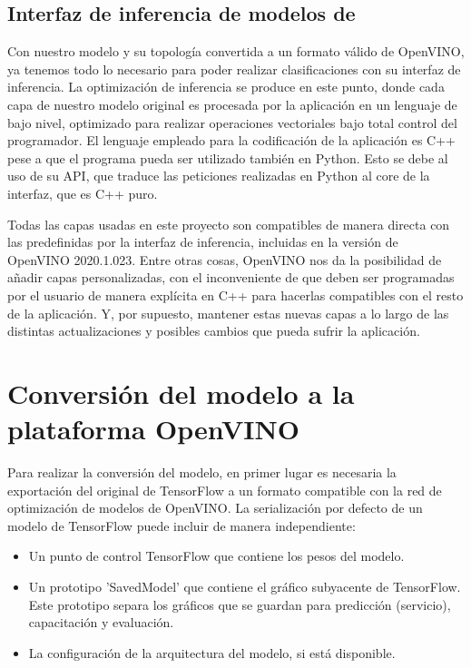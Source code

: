 \subsection{Interfaz de inferencia de modelos de }
\label{subsec:interfaz-de-infernecia-de-modelos-de-deep-learning}
Con nuestro modelo y su topología convertida a un formato válido de OpenVINO, ya tenemos todo lo necesario para poder realizar clasificaciones con su interfaz de inferencia\@.
La optimización de inferencia se produce en este punto, donde cada capa de nuestro modelo original es procesada por la aplicación en un lenguaje de bajo nivel, optimizado para realizar operaciones vectoriales bajo total control del programador.
El lenguaje empleado para la codificación de la aplicación es C++ pese a que el programa pueda ser utilizado también en Python.
Esto se debe al uso de su API, que traduce las peticiones realizadas en Python al core de la interfaz, que es C++ puro.

Todas las capas usadas en este proyecto son compatibles de manera directa con las predefinidas por la interfaz de inferencia, incluidas en la versión de OpenVINO 2020.1.023.
Entre otras cosas, OpenVINO nos da la posibilidad de añadir capas personalizadas, con el inconveniente de que deben ser programadas por el usuario de manera explícita en C++ para hacerlas compatibles con el resto de la aplicación.
Y, por supuesto, mantener estas nuevas capas a lo largo de las distintas actualizaciones y posibles cambios que pueda sufrir la aplicación.


\section{Conversión del modelo a la plataforma OpenVINO}\label{sec:conversión-del-modelo-a-la-plataforma-OpenVINO}
Para realizar la conversión del modelo, en primer lugar es necesaria la exportación del original de TensorFlow a un formato compatible con la red de optimización de modelos de OpenVINO\@.
La serialización por defecto de un modelo de TensorFlow puede incluir de manera independiente:

\begin{itemize}
    \item Un punto de control TensorFlow que contiene los pesos del modelo.
    \item Un prototipo 'SavedModel' que contiene el gráfico subyacente de TensorFlow.
    Este prototipo separa los gráficos que se guardan para predicción (servicio), capacitación y evaluación.
    \item La configuración de la arquitectura del modelo, si está disponible.
\end{itemize}

